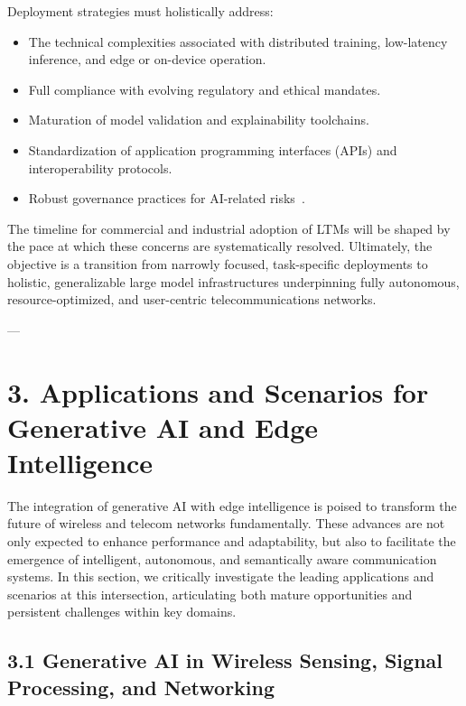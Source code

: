 \documentclass[11pt]{article}
\begin{document}
Deployment strategies must holistically address:

\begin{itemize}
    \item The technical complexities associated with distributed training, low-latency inference, and edge or on-device operation.
    \item Full compliance with evolving regulatory and ethical mandates.
    \item Maturation of model validation and explainability toolchains.
    \item Standardization of application programming interfaces (APIs) and interoperability protocols.
    \item Robust governance practices for AI-related risks~\cite{ref46,ref49}.
\end{itemize}

The timeline for commercial and industrial adoption of LTMs will be shaped by the pace at which these concerns are systematically resolved. Ultimately, the objective is a transition from narrowly focused, task-specific deployments to holistic, generalizable large model infrastructures underpinning fully autonomous, resource-optimized, and user-centric telecommunications networks.


---

\section{3. Applications and Scenarios for Generative AI and Edge Intelligence}

The integration of generative AI with edge intelligence is poised to transform the future of wireless and telecom networks fundamentally. These advances are not only expected to enhance performance and adaptability, but also to facilitate the emergence of intelligent, autonomous, and semantically aware communication systems. In this section, we critically investigate the leading applications and scenarios at this intersection, articulating both mature opportunities and persistent challenges within key domains.

\subsection{3.1 Generative AI in Wireless Sensing, Signal Processing, and Networking}
\end{document}
